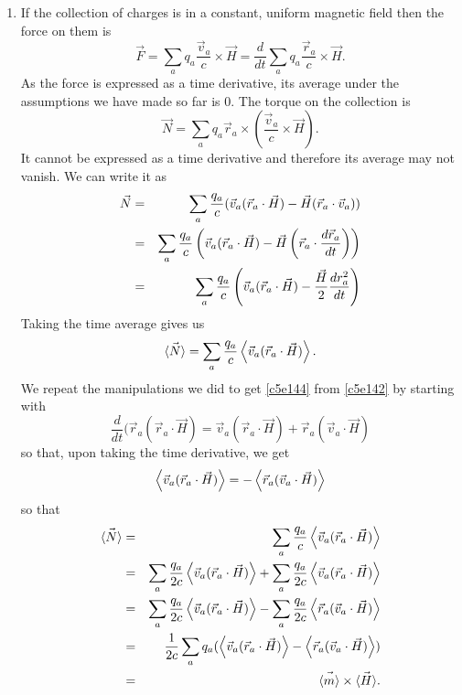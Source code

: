 \begin{enumerate}
\item If the collection of charges is in a constant, uniform magnetic field then
the force on them is
\[
\vec{F} = \sum_a q_a\frac{\vec{v}_a}{c}\times\vec{H} = 
\frac{d}{dt}\sum_a q_a\frac{\vec{r}_a}{c}\times\vec{H}.
\]
As the force is expressed as a time derivative, its average under the 
assumptions we have made so far is $0$. The torque on the collection is
\begin{equation}\label{c5e150}
\vec{N} = \sum_a q_a\vec{r}_a \times 
\left(\frac{\vec{v}_a}{c}\times\vec{H}\right).
\end{equation}
It cannot be expressed as a time derivative and therefore its average may not
vanish. We can write it as
\begin{eqnarray*}
\vec{N} &=& \sum_a\frac{q_a}{c}(\vec{v}_a(\vec{r}_a\cdot\vec{H}) - 
 \vec{H}(\vec{r}_a\cdot\vec{v}_a)) \\
 &=& \sum_a\frac{q_a}{c}\left(\vec{v}_a(\vec{r}_a\cdot\vec{H}) - 
  \vec{H}\left(\vec{r}_a\cdot\frac{d{\vec{r}_a}}{d{t}}\right)\right) \\
 &=& \sum_a\frac{q_a}{c}\left(\vec{v}_a(\vec{r}_a\cdot\vec{H}) - 
 \frac{\vec{H}}{2}\frac{d{r_a^2}}{d{t}}\right)
\end{eqnarray*}
Taking the time average gives us
\begin{equation}\label{c5e151}
\vec{\left\langle{N}\right\rangle} = \sum_a\frac{q_a}{c}\left\langle{\vec{v}_a(\vec{r}_a\cdot\vec{H})}\right\rangle.
\end{equation}
We repeat the manipulations we did to get \eqref{c5e144} from \eqref{c5e142} by 
starting with
\[
\frac{d}{dt}(\vec{r}_a(\vec{r}_a\cdot\vec{H}) = 
\vec{v}_a(\vec{r}_a\cdot\vec{H}) + \vec{r}_a(\vec{v}_a\cdot\vec{H})
\]
so that, upon taking the time derivative, we get
\begin{equation}\label{c5e152}
\left\langle{\vec{v}_a(\vec{r}_a\cdot\vec{H})}\right\rangle = -\left\langle{\vec{r}_a(\vec{v}_a\cdot\vec{H})}\right\rangle
\end{equation}
so that
\begin{eqnarray}
\vec{\left\langle{N}\right\rangle} &=& \sum_a\frac{q_a}{c}\left\langle{\vec{v}_a(\vec{r}_a\cdot\vec{H})}\right\rangle\nonumber\\
 &=& \sum_a\frac{q_a}{2c}\left\langle{\vec{v}_a(\vec{r}_a\cdot\vec{H})}\right\rangle + 
 \sum_a\frac{q_a}{2c}\left\langle{\vec{v}_a(\vec{r}_a\cdot\vec{H})}\right\rangle \nonumber \\
 &=& \sum_a\frac{q_a}{2c}\left\langle{\vec{v}_a(\vec{r}_a\cdot\vec{H})}\right\rangle - 
 \sum_a\frac{q_a}{2c}\left\langle{\vec{r}_a(\vec{v}_a\cdot\vec{H})}\right\rangle \nonumber \\
 &=& \frac{1}{2c}\sum_a q_a(\left\langle{\vec{v}_a(\vec{r}_a\cdot\vec{H})}\right\rangle - 
 \left\langle{\vec{r}_a(\vec{v}_a\cdot\vec{H})}\right\rangle) 
 \nonumber \\
 &=& \vec{\left\langle{m}\right\rangle} \times \vec{\left\langle{H}\right\rangle}. \label{c5e153}
\end{eqnarray}


\end{enumerate}
